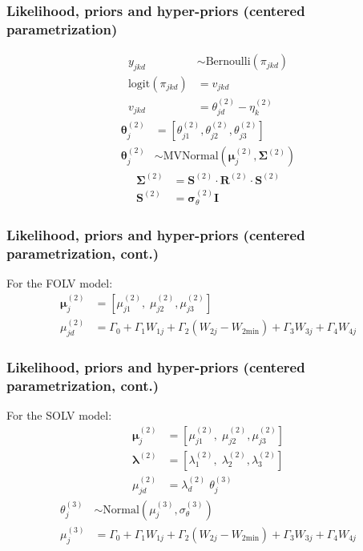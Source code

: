 \documentclass[arial,12pt,xcolor=dvipsnames]{beamer}
\begin{document}
\begin{frame}
	\frametitle{Likelihood, priors and hyper-priors
		(centered parametrization)}
	\begin{align}
		y_{jkd} &\sim \text{Bernoulli}( \pi_{jkd} ) \\
		\text{logit}( \pi_{jkd} ) &= v_{jkd} \\
		v_{jkd} &= \theta^{(2)}_{jd} - \eta^{(2)}_{k}
	\end{align}
	\begin{align}
		\boldsymbol{\theta}^{(2)}_{j} &= \left[ \theta_{j1}^{(2)}, \theta_{j2}^{(2)}, \theta_{j3}^{(2)} \right] \\
		\boldsymbol{\theta}^{(2)}_{j} &\sim \text{MVNormal} \left( \boldsymbol{\mu}^{(2)}_{j}, \boldsymbol{\Sigma}^{(2)} \right) \label{eq:theta_sub}
	\end{align}
	\begin{align} \label{eq:sigma_factoring}
		\boldsymbol{\Sigma}^{(2)} &= \boldsymbol{S}^{(2)} \cdot \boldsymbol{R}^{(2)} \cdot \boldsymbol{S}^{(2)} \\
		\boldsymbol{S}^{(2)} &= \pmb{\sigma}^{(2)}_{\theta} \mathbf{I}
	\end{align}
\end{frame}
%
\begin{frame}
	\frametitle{Likelihood, priors and hyper-priors
		(centered parametrization, cont.)}
	For the FOLV model:
	\begin{align}
		\boldsymbol{\mu}^{(2)}_{j} &= \left[ \mu^{(2)}_{j1}, \; \mu^{(2)}_{j2}, \mu^{(2)}_{j3} \right] \label{eq:mu_FOLV} \\
		\mu^{(2)}_{jd} &= \Gamma_{0} + \Gamma_{1} W_{1j} + \Gamma_{2} (W_{2j} - W_{2\text{min}}) + \Gamma_{3} W_{3j} + \Gamma_{4} W_{4j}
	\end{align}
\end{frame}
%
\begin{frame}
	\frametitle{Likelihood, priors and hyper-priors
		(centered parametrization, cont.)}
	For the SOLV model:
	\begin{align}
		\boldsymbol{\mu}^{(2)}_{j} &= \left[ \mu^{(2)}_{j1}, \; \mu^{(2)}_{j2}, \mu^{(2)}_{j3} \right] \\
		\pmb{\lambda}^{(2)} &= \left[ \lambda^{(2)}_{1}, \; \lambda^{(2)}_{2}, \lambda^{(2)}_{3} \right] \\
		\mu^{(2)}_{jd} &= \lambda^{(2)}_{d} \; \theta^{(3)}_{j} 
	\end{align}
	\begin{align}
		\theta^{(3)}_{j} &\sim \text{Normal} \left( \mu^{(3)}_{j}, \sigma^{(3)}_{\theta} \right) \label{eq:theta} \\
		\mu^{(3)}_{j} &=  \Gamma_{0} + \Gamma_{1} W_{1j} + \Gamma_{2} (W_{2j} - W_{2\text{min}}) + \Gamma_{3} W_{3j} + \Gamma_{4} W_{4j} \label{eq:mu_SOLV}
	\end{align}
\end{frame}
\end{document}
